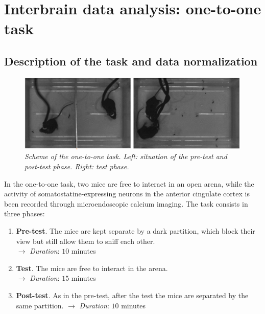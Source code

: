 \documentclass[a4paper]{article}
\begin{document}
	
	
	
\section{Interbrain data analysis: one-to-one task}


\subsection{Description of the task and data normalization}

\begin{figure}[H]
	\begin{center}
		\includegraphics[scale=.85]{one-one.png} 
	\end{center} 
	\caption{\textit{Scheme of the one-to-one task. Left: situation of the pre-test and post-test phase. Right: test phase.}}
	
\end{figure}

In the one-to-one task, two mice are free to interact in an open arena, while the activity of somatostatine-expressing neurons in the anterior cingulate cortex is been recorded through microendoscopic calcium imaging. The task consists in three phases:

\begin{enumerate}
	\item \textbf{Pre-test}. The mice are kept separate by a dark partition, which block their view but still allow them to sniff each other.\\
	$\longrightarrow$ \textit{Duration}: $10$ minutes
	
	\item \textbf{Test}. The mice are free to interact in the arena.\\
	$\longrightarrow$ \textit{Duration}: $15$ minutes
	
	\item \textbf{Post-test}. As in the pre-test, after the test the mice are separated by the same partition.
	$\longrightarrow$ \textit{Duration}: $10$ minutes
\end{enumerate}
\end{document}
